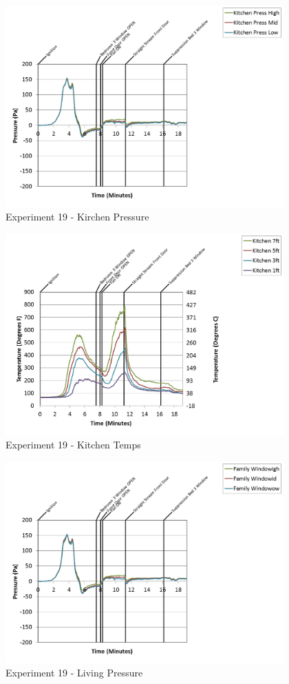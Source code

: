 \documentclass{article}
\begin{document}
\begin{appendices}
\begin{figure}[h!]
	\centering
	\includegraphics[height=3.05in]{0_Images/Results_Charts/Exp_19_Charts/KirchenPressure.png}
	\caption{Experiment 19 - Kirchen Pressure}
\end{figure}

\clearpage

\begin{figure}[h!]
	\centering
	\includegraphics[height=3.05in]{0_Images/Results_Charts/Exp_19_Charts/KitchenTemps.png}
	\caption{Experiment 19 - Kitchen Temps}
\end{figure}


\begin{figure}[h!]
	\centering
	\includegraphics[height=3.05in]{0_Images/Results_Charts/Exp_19_Charts/LivingPressure.png}
	\caption{Experiment 19 - Living Pressure}
\end{figure}


\end{appendices}
\end{document}
